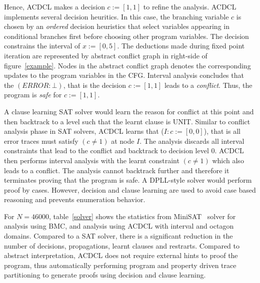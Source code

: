 Hence, ACDCL makes a decision $c:=[1,1]$ to refine the analysis.  
ACDCL implements several decision heuritics.  In this case, the 
branching variable $c$ is chosen by an {\em ordered} decision 
heuristics that select variables appearing in conditional branches 
first before choosing other program variables. 
The decision constrains the interval of $x:=[0,5]$.  The deductions made 
during fixed point iteration are represented by abstract conflict 
graph in right-side of figure~\ref{example}.  Nodes in the abstract 
conflict graph denotes the corresponding updates to the program 
variables in the CFG.  Interval analysis concludes that the $(ERROR:\bot)$, that 
is the decision $c:=[1,1]$ leads to a {\em conflict}.  Thus, 
the program is {\em safe} for $c:=[1,1]$.  

A clause learning SAT solver would learn the reason for conflict at this 
point and then backtrack to a level such that the learnt clause is UNIT.  
Similar to conflict analysis phase in SAT solvers, ACDCL learns that 
(\(I: c:=[0,0]\)), that is all error traces must satisfy $(c \neq 1)$ 
at node $I$.  The analysis discards all interval constraints that
lead to the conflict and backtrack to decision level 0.  ACDCL then 
performs interval analysis with the learnt constraint $(c \neq 1)$ which also 
leads to a conflict.  The analysis cannot backtrack further and therefore 
it terminates proving that the program is safe.  A DPLL-style solver would 
perform proof by cases.  However, decision and clause learning are used 
to avoid case based reasoning and prevents enumeration behavior.     
   
For $N=46000$, table~\ref{solver} shows the statistics from 
MiniSAT~\cite{minisat} solver for analysis using BMC, and 
analysis using ACDCL with interval and octagon domains.  
Compared to a SAT solver, there is a significant reduction 
in the number of decisions, propagations, learnt clauses and 
restrarts.  Compared to abstract interpretation, ACDCL does 
not require external hints to proof the program, thus 
automatically performing program and property driven trace 
partitioning to generate proofs using decision and clause learning.  
